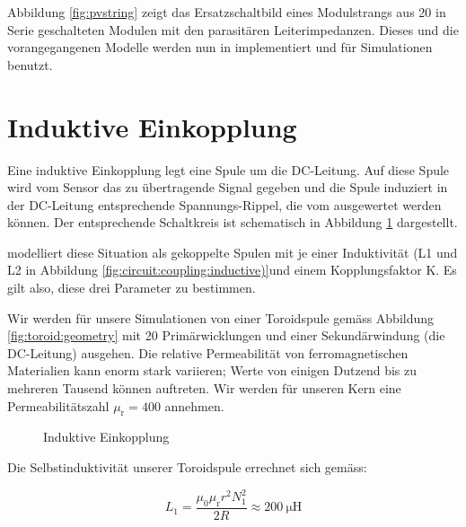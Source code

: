 Abbildung  \ref{fig:pvstring} zeigt  das  Ersatzschaltbild eines  Modulstrangs
aus    20   in    Serie   geschalteten    Modulen   mit    den   parasit\"aren
Leiterimpedanzen. Dieses  und  die  vorangegangenen   Modelle  werden  nun  in
 implementiert und f\"ur Simulationen benutzt.


\section{Induktive Einkopplung}
\label{sec:simu:coupling:inductive}

Eine induktive Einkopplung legt eine  Spule um die DC-Leitung. Auf diese Spule
wird vom Sensor  das zu \"ubertragende Signal gegeben und  die Spule induziert
in der DC-Leitung entsprechende  Spannungs-Rippel, die vom \Master ausgewertet
werden k\"onnen. Der  entsprechende Schaltkreis  ist schematisch  in Abbildung
\ref{fig:circuit:coupling:inductive} dargestellt.

    modelliert   diese    Situation   als    gekoppelte   Spulen
mit    je     einer    Induktivit\"at     (L1    und    L2     in    Abbildung
\ref{fig:circuit:coupling:inductive)}und  einem   Kopplungsfaktor  K. Es  gilt
also, diese drei Parameter zu bestimmen.

Wir  werden   f\"ur  unsere   Simulationen  von  einer   Toroidspule  gem\"ass
Abbildung  \ref{fig:toroid:geometry}  mit   20  Prim\"arwicklungen  und  einer
Sekund\"arwindung (die DC-Leitung) ausgehen.  Die relative Permeabilit\"at von
ferromagnetischen Materialien  kann enorm  stark variieren; Werte  von einigen
Dutzend bis zu  mehreren Tausend k\"onnen auftreten. Wir  werden f\"ur unseren
Kern eine Permeabilit\"atszahl $\mu_{\mathrm{r}} = 400$ annehmen.

\clearpage
\begin{figure}[h!tb]
    \centering
    
    \caption[Prinzip der induktiven Einkopplung]{Induktive Einkopplung}
    \label{fig:circuit:coupling:inductive}
\end{figure}


Die Selbstinduktivit\"at unserer Toroidspule errechnet sich gem\"ass:

\begin{equation}
    \label{eq:selfInductance:toroid:primary}
    L_{\mathrm{1}} = \frac{\mu_{0} \mu_{\mathrm{r}} r^2 N_1^2}{2 R} \approx \SI{200}{\micro\henry}
\end{equation}

